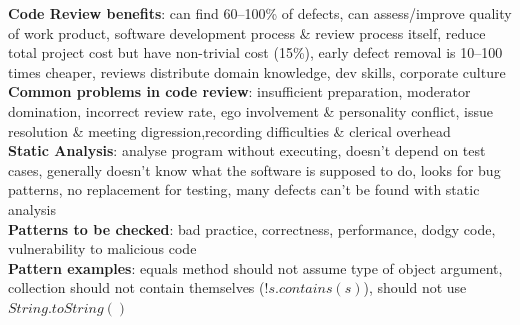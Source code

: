 \documentclass[a4paper]{article}
\begin{document}
\begin{multicols}{3}
        \textbf{Code Review benefits}: can find 60--100\% of defects, can assess/improve quality of work product, software development process \& review process itself, reduce total project cost but have non-trivial cost (15\%), early defect removal is 10--100 times cheaper, reviews distribute domain knowledge, dev skills, corporate culture\\
        \textbf{Common problems in code review}: insufficient preparation, moderator domination, incorrect review rate, ego involvement \& personality conflict, issue resolution \& meeting digression,recording difficulties \& clerical overhead\\
        \textbf{Static Analysis}: analyse program without executing, doesn't depend on test cases, generally doesn't know what the software is supposed to do, looks for bug patterns, no replacement for testing, many defects can't be found with static analysis\\
        \textbf{Patterns to be checked}: bad practice, correctness, performance, dodgy code, vulnerability to malicious code\\
        \textbf{Pattern examples}: equals method should not assume type of object argument, collection should not contain themselves ($!s.contains(s)$), should not use $String.toString()$\\
    \end{multicols}
    
\end{document}
